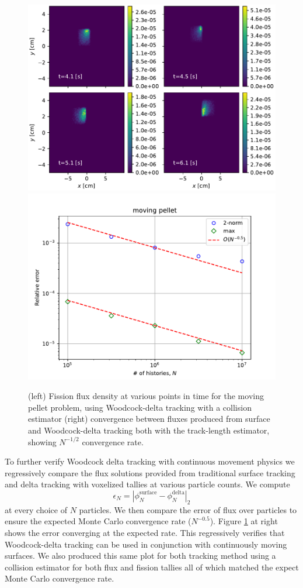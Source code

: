 \begin{figure}
    \centering
    \includegraphics[width=0.49\linewidth]{monte_carlo/delta_tracking/figures/verification/moving_pellet_plot.pdf}
    \includegraphics[width=0.49\linewidth]{monte_carlo/delta_tracking/figures/verification/moving_pellet.pdf}
    \caption{(left) Fission flux density at various points in time for the moving pellet problem, using Woodcock-delta tracking with a collision estimator (right) convergence between fluxes produced from surface and Woodcock-delta tracking both with the track-length estimator, showing $N^{-1/2}$ convergence rate.}
    \label{fig:moving_pellet}
\end{figure}

To further verify Woodcock delta tracking with continuous movement physics we regressively compare the flux solutions provided from traditional surface tracking and delta tracking with voxelized tallies at various particle counts.
We compute 
\begin{equation}
    \epsilon_N = |\phi_N^{\text{surface}} - \phi_N^{\text{delta}} |_2
\end{equation}
at every choice of $N$ particles.
We then compare the error of flux over particles to ensure the expected Monte Carlo convergence rate ($N^{-0.5}$).
Figure \ref{fig:moving_pellet} at right shows the error converging at the expected rate.
This regressively verifies that Woodcock-delta tracking can be used in conjunction with continuously moving surfaces.
We also produced this same plot for both tracking method using a collision estimator for both flux and fission tallies all of which matched the expect Monte Carlo convergence rate.

